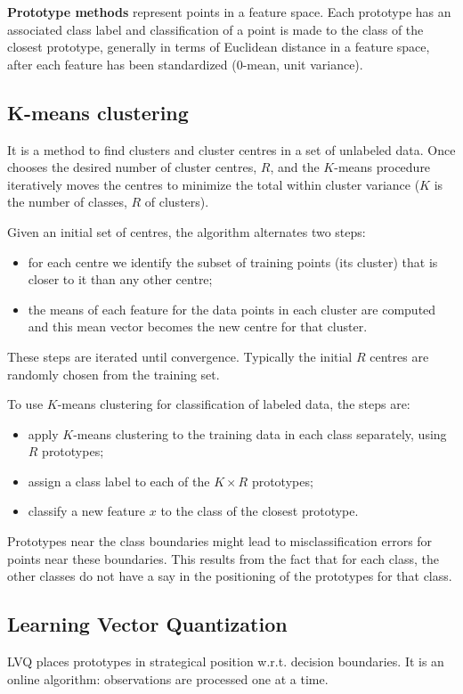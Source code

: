 \documentclass[12pt, letterpaper]{article}
\theoremstyle{definition}
\begin{document}
\textbf{Prototype methods} represent points in a feature space. Each prototype has an associated class label and classification of a point is made to the class of the closest prototype, generally in terms of Euclidean distance in a feature space, after each feature has been standardized (0-mean, unit variance).

\subsection{K-means clustering}
It is a method to find clusters and cluster centres in a set of unlabeled data. Once chooses the desired number of cluster centres, $R$, and the $K$-means procedure iteratively moves the centres to minimize the total within cluster variance ($K$ is the number of classes, $R$ of clusters).

Given an initial set of centres, the algorithm alternates two steps:
\begin{itemize}
\item for each centre we identify the subset of training points (its cluster) that is closer to it than any other centre;
\item the means of each feature for the data points in each cluster are computed and this mean vector becomes the new centre for that cluster.
\end{itemize}
These steps are iterated until convergence. Typically the initial $R$ centres are randomly chosen from the training set.

To use $K$-means clustering for classification of labeled data, the steps are:
\begin{itemize}
\item apply $K$-means clustering to the training data in each class separately, using $R$ prototypes;
\item assign a class label to each of the $K \times R$ prototypes;
\item classify a new feature $x$ to the class of the closest prototype.
\end{itemize}
Prototypes near the class boundaries might lead to misclassification errors for points near these boundaries. This results from the fact that for each class, the other classes do not have a say in the positioning of the prototypes for that class.

\subsection{Learning Vector Quantization}
LVQ places prototypes in strategical position w.r.t. decision boundaries. It is an online algorithm: observations are processed one at a time.
\end{document}
